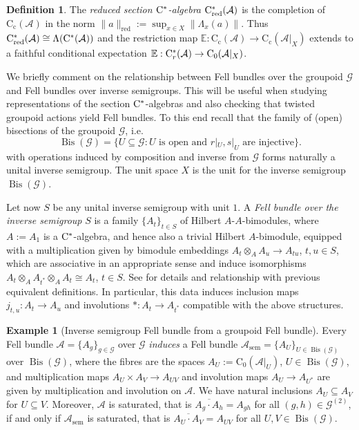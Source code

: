 \documentclass[11 pt, leqno]{amsart}
\numberwithin{equation}{section}
\theoremstyle{plain}
\theoremstyle{definition}
\newtheorem {defn}[thm] {Definition}
\newtheorem{ex}[thm]{Example}
\newcommand*{\contc}{\mathrm{C_c}}%
\newcommand*{\contz}{\mathrm{C_0}}%
\DeclareMathOperator{\red}{red}%
\DeclareMathOperator{\sem}{sem}
\DeclareMathOperator{\Bis}{Bis}
\newcommand{\G}{\mathcal G} %
\newcommand{\A}{\mathcal A}
\newcommand{\E}{\mathbb E}
\newcommand{\cst}{\ifmmode\mathrm{C}^*\else{$\mathrm{C}^*$}\fi}
\begin{document}
\begin{defn}
The \emph{reduced section $\cst$-algebra} $\cst_{\red}(\A)$ is the completion of $\contc(\A)$ in the norm  $\|a\|_{\red}:=\sup_{x\in X}\|\Lambda_x(a)\|$. 
Thus $\cst_{\red}(\A)\cong \Lambda(\cst(\A))$ and the restriction map $\E:\contc(\A)\to \contc(\A|_X)$ extends to a faithful conditional expectation $\E:\cst_r(\A)\to \contz(\A|_X)$.	
\end{defn}

We briefly comment on the relationship between Fell bundles over the groupoid $\G$ and Fell bundles over inverse semigroups. 
This will be useful when studying representations of the section $\cst$-algebras and also checking that twisted groupoid actions yield  Fell bundles.
To this end recall that the family of (open) bisections of the groupoid $\G$, i.e.\ 
\[
    \Bis(\G) = \{ U\subseteq \G : \text{$U$ is open and $r|_U , s|_U$ are injective} \} .
\]
with operations induced by composition and inverse from $\G$ forms naturally a unital inverse semigroup. 
The unit space $X$ is the unit for the inverse semigroup $\Bis(\G)$.

Let now $S$ be any unital inverse semigroup with unit $1$. 
A \emph{Fell bundle over the inverse semigroup} $S$ is a family $\{ A_{t} \}_{t\in S}$ of Hilbert $A$-$A$-bimodules, where $A := A_1$ is a $\cst$-algebra, and hence also a trivial Hilbert $A$-bimodule, equipped with a multiplication given by bimodule embeddings $A_{t}\otimes_A A_{u}\to A_{tu}$, $t,u\in S$, which are associative in an appropriate sense and induce isomorphisms $A_{t}\otimes_A A_{t^*}\otimes_A A_{t}\cong A_t$, $t\in S$. 
See \cite{BussMartinez} for details and relationship with previous equivalent definitions. 
In particular, this data induces inclusion maps $j_{t,u}:A_{t}\to A_{u}$ and involutions $*:A_{t}\to A_{t^*}$ compatible with  the above structures. 

\begin{ex}[Inverse semigroup Fell bundle from a groupoid Fell bundle]\label{ex:Inverse semigroup Fell bundle from a groupoid Fell bundle}
Every Fell bundle $\A=\{A_g\}_{g\in \G}$ over $\G$ \emph{induces} a Fell bundle $\A_{\sem}=\{A_U\}_{U\in \Bis(\G)}$ over $\Bis(\G)$, where the fibres are the spaces $A_{U}:=\contz(\A|_{U})$, $U\in \Bis(\G)$, and multiplication maps $A_{U}\times A_{V}\to A_{UV}$ and involution maps $A_{U}\to A_{U^*}$ are given by multiplication and involution on $\A$. 
We have natural inclusions $A_{U}\subseteq A_{V}$ for $U\subseteq V$. 
Moreover, $\A$ is saturated, that is $\overline{A_g\cdot A_h}=A_{gh}$
for all $(g,h)\in \G^{(2)}$, if and only if $\A_{\sem}$ is saturated, that is $\overline{A_{U}\cdot A_{V}}=A_{UV}$ for all $U,V\in \Bis(\G)$. 
\end{ex}
\end{document}
